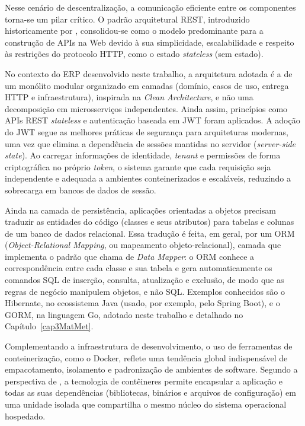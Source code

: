 Nesse cenário de descentralização, a comunicação eficiente entre os componentes torna-se um pilar crítico. O padrão arquitetural REST, introduzido historicamente por , consolidou-se como o modelo predominante para a construção de APIs na Web devido à sua simplicidade, escalabilidade e respeito às restrições do protocolo HTTP, como o estado \textit{stateless} (sem estado).

No contexto do ERP desenvolvido neste trabalho, a arquitetura adotada é a de um monólito modular organizado em camadas (domínio, casos de uso, entrega HTTP e infraestrutura), inspirada na \textit{Clean Architecture}, e não uma decomposição em microsserviços independentes. Ainda assim, princípios como APIs REST \textit{stateless} e autenticação baseada em JWT foram aplicados. A adoção do JWT segue as melhores práticas de segurança para arquiteturas modernas, uma vez que elimina a dependência de sessões mantidas no servidor (\textit{server-side state}). Ao carregar informações de identidade, \textit{tenant} e permissões de forma criptográfica no próprio \textit{token}, o sistema garante que cada requisição seja independente e adequada a ambientes conteinerizados e escaláveis, reduzindo a sobrecarga em bancos de dados de sessão.

Ainda na camada de persistência, aplicações orientadas a objetos precisam traduzir as entidades do código (classes e seus atributos) para tabelas e colunas de um banco de dados relacional. Essa tradução é feita, em geral, por um ORM (\textit{Object-Relational Mapping}, ou mapeamento objeto-relacional), camada que implementa o padrão que  chama de \textit{Data Mapper}: o ORM conhece a correspondência entre cada classe e sua tabela e gera automaticamente os comandos SQL de inserção, consulta, atualização e exclusão, de modo que as regras de negócio manipulem objetos, e não SQL. Exemplos conhecidos são o Hibernate, no ecossistema Java (usado, por exemplo, pelo Spring Boot), e o GORM, na linguagem Go, adotado neste trabalho e detalhado no Capítulo~\ref{cap3MatMet}.

Complementando a infraestrutura de desenvolvimento, o uso de ferramentas de conteinerização, como o Docker, reflete uma tendência global indispensável de empacotamento, isolamento e padronização de ambientes de software. Segundo a perspectiva de , a tecnologia de contêineres permite encapsular a aplicação e todas as suas dependências (bibliotecas, binários e arquivos de configuração) em uma unidade isolada que compartilha o mesmo núcleo do sistema operacional hospedado.

